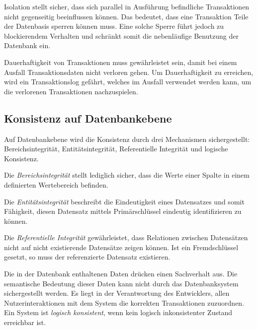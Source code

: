 \par Isolation stellt sicher, dass sich parallel in Ausführung befindliche Transaktionen nicht gegenseitig beeinflussen können. Das bedeutet, dass eine Transaktion Teile der Datenbasis sperren können muss. Eine solche Sperre führt jedoch zu blockierendem Verhalten und schränkt somit die nebenläufige Benutzung der Datenbank ein. 

\par Dauerhaftigkeit von Transaktionen muss gewährleistet sein, damit bei einem Ausfall Transaktionsdaten nicht verloren gehen. Um Dauerhaftigkeit zu erreichen, wird ein Transaktionslog gefährt, welches im Ausfall verwendet werden kann, um die verlorenen Transaktionen nachzuspielen. 

\subsection{Konsistenz auf Datenbankebene}

Auf Datenbankebene wird die Konsistenz durch drei Mechanismen sichergestellt: Bereichsintegrität, Entitätsintegrität, Referentielle Integrität und logische Konsistenz.

Die \textit{Bereichsintegrität} stellt lediglich sicher, dass die Werte einer Spalte in einem definierten Wertebereich befinden. 

Die \textit{Entitätsintegrität} beschreibt die Eindeutigkeit eines Datensatzes und somit Fähigkeit, diesen Datensatz mittels Primärschlüssel eindeutig identifizieren zu können.

Die \textit{Referentielle Integrität} gewährleistet, dass Relationen zwischen Datensätzen nicht auf nicht existierende Datensätze zeigen können. Ist ein Fremdschlüssel gesetzt, so muss der referenzierte Datensatz existieren. 

Die in der Datenbank enthaltenen Daten drücken einen Sachverhalt aus. Die semantische Bedeutung dieser Daten kann nicht durch das Datenbanksystem sichergestellt werden. Es liegt in der Verantwortung des Entwicklers, allen Nutzerinteraktionen mit dem System die korrekten Transaktionen zuzuordnen. Ein System ist \textit{logisch konsistent}, wenn kein logisch inkonsistenter Zustand erreichbar ist. 